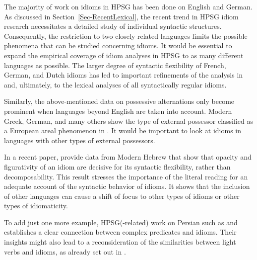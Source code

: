 \documentclass[output=paper
                ,modfonts
                ,nonflat
	        ,collection
	        ,collectionchapter
	        ,collectiontoclongg
 	        ,biblatex
                ,babelshorthands
                ,newtxmath
                ,draftmode
                ,colorlinks, citecolor=brown
]{./langsci/langscibook}
\begin{document}
The majority of work on idioms in HPSG has been done on English and German. 
As discussed in Section~\ref{Sec-RecentLexical}, the recent trend in HPSG idiom research necessitates a detailed study of individual syntactic structures. 
Consequently, the restriction to two closely related languages limits the possible phenomena that can be studied concerning idioms. 
It would be essential to expand the empirical coverage of idiom analyses in HPSG to as many different languages as possible. 
The larger degree of syntactic flexibility of French, German, and Dutch idioms \citep{Ruwet:91,NSW94a,Schenk:95} has led to important refinements of the analysis in \citet{NSW94a} and, ultimately, to the lexical analyses of all syntactically regular idioms. 

Similarly, the above-mentioned data on possessive alternations only become prominent when languages beyond English are taken into account. Modern Greek, German, and many others
show the type of external possessor classified as a European areal phenomenon in \citet{Haspelmath:99}. 
It would be important to look at idioms in languages with other types of external possessors.


In a recent paper, \citet{Sheinfux:al:19} provide data from Modern Hebrew that show that opacity and figurativity of an idiom are decisive for its syntactic flexibility, rather than decomposability.
This result stresses the importance of the literal reading for an adequate account of the syntactic behavior of idioms. 
%
It shows that the inclusion of other languages can cause a shift of focus to other types of idioms or other types of idiomaticity. 

To add just one more example, HPSG(-related) work on Persian such as \citet{MuellerPersian-unlinked} and \citet{Samvelian:Faghiri:16} establishes a clear connection between complex predicates and idioms. 
Their insights might also lead to a reconsideration of the similarities between light verbs and idioms, as already set out in \citet{KE94a}.



\end{document}
